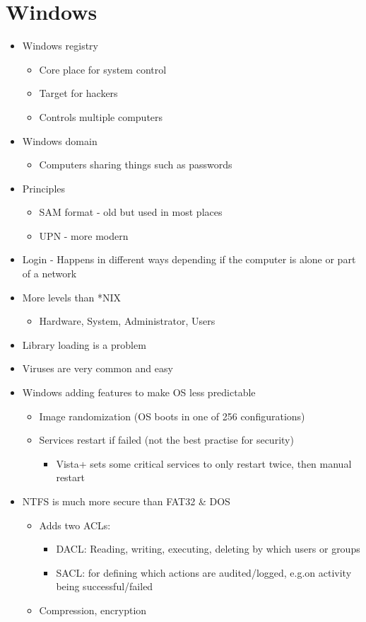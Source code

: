 \documentclass{article}[18pt]
\begin{document}
\section{Windows}
\begin{itemize}
	\item Windows registry
	\begin{itemize}
		\item Core place for system control
		\item Target for hackers
		\item Controls multiple computers
	\end{itemize}
	\item Windows domain
	\begin{itemize}
		\item Computers sharing things such as passwords
	\end{itemize}
	\item Principles
	\begin{itemize}
		\item SAM format - old but used in most places
		\item UPN - more modern
	\end{itemize}
	\item Login - Happens in different ways depending if the computer is alone or part of a network
	\item More levels than *NIX
	\begin{itemize}
		\item Hardware, System, Administrator, Users
	\end{itemize}
	\item Library loading is a problem
	\item Viruses are very common and easy
	\item Windows adding features to make OS less predictable
	\begin{itemize}
		\item Image randomization (OS boots in one of 256 configurations)
		\item Services restart if failed (not the best practise for security)
		\begin{itemize}
			\item Vista+ sets some critical services to only restart twice, then manual restart
		\end{itemize}
	\end{itemize}
	\item NTFS is much more secure than FAT32 \& DOS
	\begin{itemize}
		\item Adds two ACLs:
		\begin{itemize}
			\item DACL: Reading, writing, executing, deleting by which users or groups
			\item SACL: for defining which actions are audited/logged, e.g.on activity being successful/failed
		\end{itemize}
		\item Compression, encryption
	\end{itemize}
\end{itemize}
\end{document}
